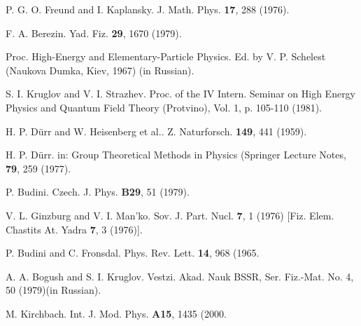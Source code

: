 \documentclass[a4paper,12pt]{article}
\begin{document}
\begin{thebibliography}{99}
\bibitem{}  P. G. O. Freund and I. Kaplansky. J. Math. Phys. \textbf{
17}, 288 (1976).

\bibitem{}  F. A. Berezin. Yad. Fiz. \textbf{29}, 1670 (1979).

\bibitem{}  Proc. High-Energy and Elementary-Particle Physics. Ed. by
V. P. Schelest (Naukova Dumka, Kiev, 1967) (in Russian).

\bibitem{}  S. I. Kruglov and V. I. Strazhev. Proc. of the IV Intern.
Seminar on High Energy Physics and Quantum Field Theory
(Protvino), Vol. 1, p. 105-110 (1981).

\bibitem{}  H. P. D\"urr and W. Heisenberg et al.. Z. Naturforsch.
\textbf{149}, 441 (1959).

\bibitem{}  H. P. D\"urr. in: Group Theoretical Methods in Physics
(Springer Lecture Notes, \textbf{79}, 259 (1977).

\bibitem{}  P. Budini. Czech. J. Phys. \textbf{B29}, 51 (1979).

\bibitem{}  V. L. Ginzburg and V. I. Man'ko. Sov. J. Part. Nucl.
\textbf{7}, 1 (1976) [Fiz. Elem. Chastits At. Yadra \textbf{7}, 3
(1976)].

\bibitem{}  P. Budini and C. Fronsdal. Phys. Rev. Lett. \textbf{14},
968 (1965.

\bibitem{}  A. A. Bogush and S. I. Kruglov. Vestzi. Akad. Nauk BSSR,
Ser. Fiz.-Mat. No. 4, 50 (1979)(in Russian).

\bibitem{}  M. Kirchbach. Int. J. Mod. Phys. \textbf{A15}, 1435 (2000.
\end{thebibliography}
\end{document}

